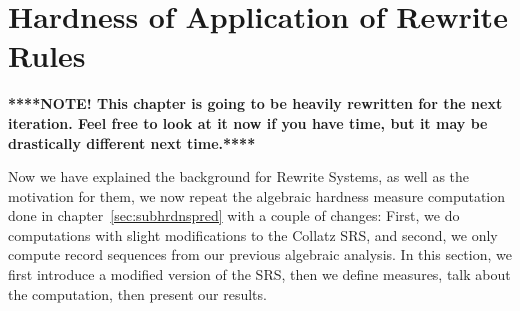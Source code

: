 
\chapter{Hardness of Application of Rewrite Rules} \label{sec:hardnessrewriterules}
\textbf{****NOTE! This chapter is going to be heavily rewritten for the next iteration. Feel free to look at it now if you have time, but it may be drastically different next time.****}\par
Now we have explained the background for Rewrite Systems, as well as the motivation for them, we now repeat the algebraic hardness measure computation done in chapter~\ref{sec:subhrdnspred} with a couple of changes: First, we do computations with slight modifications to the Collatz SRS, and second, we only compute record sequences from our previous algebraic analysis. In this section, we first introduce a modified version of the SRS, then we define measures, talk about the computation, then present our results.

